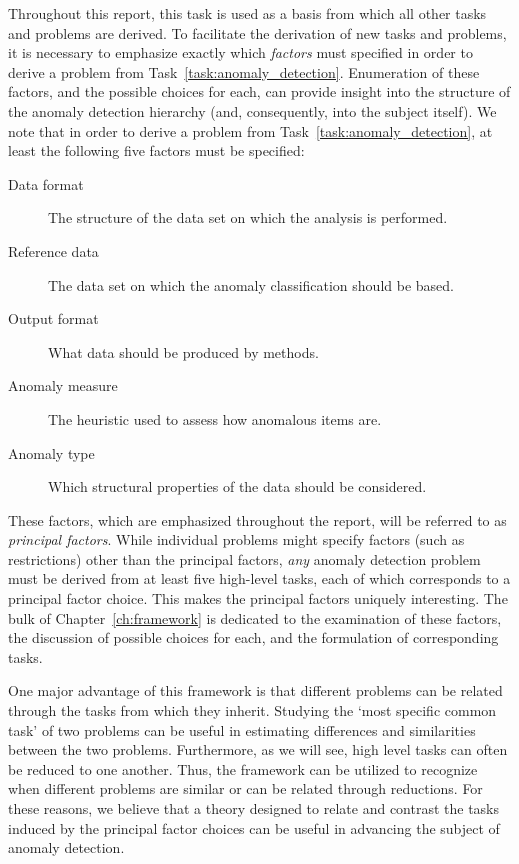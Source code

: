 Throughout this report, this task is used as a basis from which all other tasks and problems are derived. To facilitate the derivation of new tasks and problems, it is necessary to emphasize exactly which \emph{factors} must specified in order to derive a problem from Task~\ref{task:anomaly_detection}. Enumeration of these factors, and the possible choices for each, can provide insight into the structure of the anomaly detection hierarchy (and, consequently, into the subject itself). We note that in order to derive a problem from Task~\ref{task:anomaly_detection}, at least the following five factors must be specified:
\begin{description}
  \item[Data format] The structure of the data set on which the analysis is performed.
  \item[Reference data] The data set on which the anomaly classification should be based.
  \item[Output format] What data should be produced by methods.
  \item[Anomaly measure] The heuristic used to assess how anomalous items are.
  \item[Anomaly type] Which structural properties of the data should be considered.
\end{description}
These factors, which are emphasized throughout the report, will be referred to as \emph{principal factors}. While individual problems might specify factors (such as restrictions) other than the principal factors, \emph{any} anomaly detection problem must be derived from at least five high-level tasks, each of which corresponds to a principal factor choice. This makes the principal factors uniquely interesting. The bulk of Chapter~\ref{ch:framework} is dedicated to the examination of these factors, the discussion of possible choices for each, and the formulation of corresponding tasks.

One major advantage of this framework is that different problems can be related through the tasks from which they inherit. Studying the `most specific common task' of two problems can be useful in estimating differences and similarities between the two problems. Furthermore, as we will see, high level tasks can often be reduced to one another. Thus, the framework can be utilized to recognize when different problems are similar or can be related through reductions. For these reasons, we believe that a theory designed to relate and contrast the tasks induced by the principal factor choices can be useful in advancing the subject of anomaly detection.

